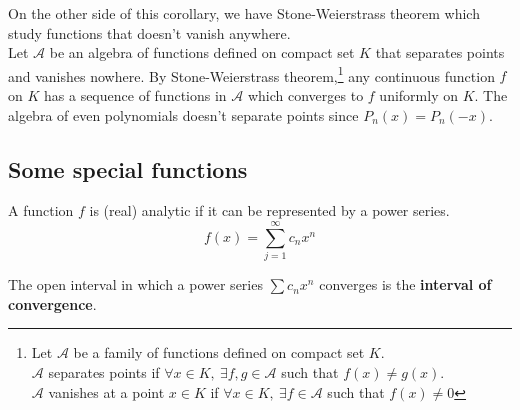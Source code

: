 \begin{remark}
	On the other side of this corollary, we have Stone-Weierstrass theorem which study functions that doesn't vanish anywhere.\\

	Let $\mathscr{A}$ be an algebra of functions defined on compact set $K$ that separates points and vanishes nowhere.
	By Stone-Weierstrass theorem,\dag\footnote{
		\cite[\S7.32]{rudin} Let $\mathscr{A}$ be a family of functions defined on compact set $K$.\\
		$\mathscr{A}$ separates points if $\forall x \in K,\ \exists f,g \in \mathscr{A}$ such that $f(x) \ne g(x)$.\\
		$\mathscr{A}$ vanishes at a point $x \in K$ if $\forall x \in K,\ \exists f \in \mathscr{A}$ such that $f(x) \ne 0$ }
	any continuous function $f$ on $K$  has a sequence of functions in $\mathscr{A}$ which converges to $f$ uniformly on $K$.
	The algebra of even polynomials doesn't separate points since $P_n(x) = P_n(-x)$.
\end{remark}

\subsection{Some special functions}
\begin{definition}
	A function $f$ is (real) analytic if it can be represented by a power series.
	\[ f(x) = \sum_{j=1}^\infty c_n x^n \]
\end{definition}

\begin{remark}
	The open interval in which a power series $\sum c_n x^n$ converges is the \textbf{interval of convergence}.
\end{remark}

